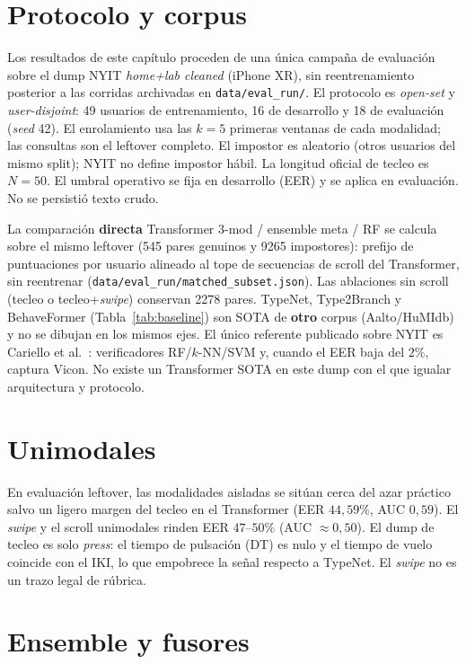 \section{Protocolo y corpus}

Los resultados de este capítulo proceden de una única campaña de evaluación sobre el dump NYIT 
\textit{home+lab cleaned} (iPhone XR), sin reentrenamiento posterior a las corridas archivadas en 
\texttt{data/eval\_run/}. El protocolo es \textit{open-set} y \textit{user-disjoint}: 49 usuarios de 
entrenamiento, 16 de desarrollo y 18 de evaluación (\textit{seed} 42). El enrolamiento usa las $k=5$ 
primeras ventanas de cada modalidad; las consultas son el leftover completo. El impostor es aleatorio 
(otros usuarios del mismo split); NYIT no define impostor hábil. La longitud oficial de tecleo es $N=50$. 
El umbral operativo se fija en desarrollo (EER) y se aplica en evaluación. No se persistió texto crudo.

La comparación \textbf{directa} Transformer 3-mod / ensemble meta / RF se calcula sobre el mismo leftover
(545 pares genuinos y 9265 impostores): prefijo de puntuaciones por usuario alineado al tope de secuencias
de scroll del Transformer, sin reentrenar (\texttt{data/eval\_run/matched\_subset.json}). Las ablaciones
sin scroll (tecleo o tecleo+\textit{swipe}) conservan 2278 pares. TypeNet, Type2Branch y BehaveFormer
(Tabla~\ref{tab:baseline}) son SOTA de \textbf{otro} corpus (Aalto/HuMIdb) y no se dibujan en los mismos
ejes. El único referente publicado sobre NYIT es Cariello et al.~\cite{cariello2025posture,cariello2026keystroke}:
verificadores RF/$k$-NN/SVM y, cuando el EER baja del $2\%$, captura Vicon. No existe un Transformer SOTA
en este dump con el que igualar arquitectura y protocolo.

\section{Unimodales}

En evaluación leftover, las modalidades aisladas se sitúan cerca del azar práctico salvo un ligero 
margen del tecleo en el Transformer (EER $44{,}59\%$, AUC $0{,}59$). El \textit{swipe} y el scroll 
unimodales rinden EER $47$--$50\%$ (AUC $\approx 0{,}50$). El dump de tecleo es solo \textit{press}: 
el tiempo de pulsación (DT) es nulo y el tiempo de vuelo coincide con el IKI, lo que empobrece la señal 
respecto a TypeNet. El \textit{swipe} no es un trazo legal de rúbrica.

\section{Ensemble y fusores}

